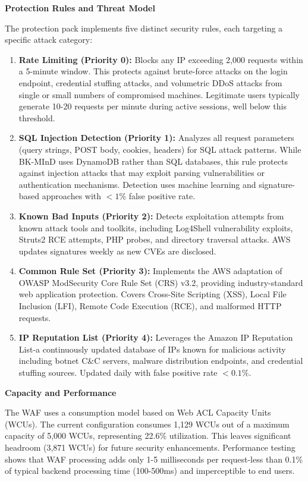 \textbf{Protection Rules and Threat Model}

The protection pack implements five distinct security rules, each targeting a specific attack category:

\begin{enumerate}
    \item \textbf{Rate Limiting (Priority 0):} Blocks any IP exceeding 2,000 requests within a 5-minute window. This protects against brute-force attacks on the login endpoint, credential stuffing attacks, and volumetric DDoS attacks from single or small numbers of compromised machines. Legitimate users typically generate 10-20 requests per minute during active sessions, well below this threshold.

    \item \textbf{SQL Injection Detection (Priority 1):} Analyzes all request parameters (query strings, POST body, cookies, headers) for SQL attack patterns. While BK-MInD uses DynamoDB rather than SQL databases, this rule protects against injection attacks that may exploit parsing vulnerabilities or authentication mechanisms. Detection uses machine learning and signature-based approaches with $<1\%$ false positive rate.

    \item \textbf{Known Bad Inputs (Priority 2):} Detects exploitation attempts from known attack tools and toolkits, including Log4Shell vulnerability exploits, Struts2 RCE attempts, PHP probes, and directory traversal attacks. AWS updates signatures weekly as new CVEs are disclosed.

    \item \textbf{Common Rule Set (Priority 3):} Implements the AWS adaptation of OWASP ModSecurity Core Rule Set (CRS) v3.2, providing industry-standard web application protection. Covers Cross-Site Scripting (XSS), Local File Inclusion (LFI), Remote Code Execution (RCE), and malformed HTTP requests.

    \item \textbf{IP Reputation List (Priority 4):} Leverages the Amazon IP Reputation List-a continuously updated database of IPs known for malicious activity including botnet C\&C servers, malware distribution endpoints, and credential stuffing sources. Updated daily with false positive rate $<0.1\%$.
\end{enumerate}

\textbf{Capacity and Performance}

The WAF uses a consumption model based on Web ACL Capacity Units (WCUs). The current configuration consumes 1,129 WCUs out of a maximum capacity of 5,000 WCUs, representing 22.6\% utilization. This leaves significant headroom (3,871 WCUs) for future security enhancements. Performance testing shows that WAF processing adds only 1-5 milliseconds per request-less than 0.1\% of typical backend processing time (100-500ms) and imperceptible to end users.

